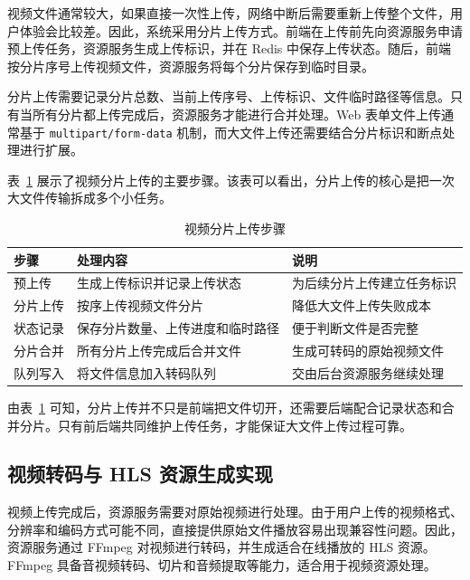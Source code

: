 视频文件通常较大，如果直接一次性上传，网络中断后需要重新上传整个文件，用户体验会比较差。因此，系统采用分片上传方式。前端在上传前先向资源服务申请预上传任务，资源服务生成上传标识，并在 Redis 中保存上传状态。随后，前端按分片序号上传视频文件，资源服务将每个分片保存到临时目录。

分片上传需要记录分片总数、当前上传序号、上传标识、文件临时路径等信息。只有当所有分片都上传完成后，资源服务才能进行合并处理。Web 表单文件上传通常基于 \texttt{multipart/form-data} 机制，而大文件上传还需要结合分片标识和断点处理进行扩展\cite{rfc7578multipart}。

表~\ref{tab:chunk-upload-steps} 展示了视频分片上传的主要步骤。该表可以看出，分片上传的核心是把一次大文件传输拆成多个小任务。

\begin{table}[htbp]
  \centering
  \caption{视频分片上传步骤}
  \label{tab:chunk-upload-steps}
  \begin{tabular}{p{}p{}p{}}
    \hline
    \textbf{步骤} & \textbf{处理内容} & \textbf{说明} \\
    \hline
    预上传 & 生成上传标识并记录上传状态 & 为后续分片上传建立任务标识 \\
    分片上传 & 按序上传视频文件分片 & 降低大文件上传失败成本 \\
    状态记录 & 保存分片数量、上传进度和临时路径 & 便于判断文件是否完整 \\
    分片合并 & 所有分片上传完成后合并文件 & 生成可转码的原始视频文件 \\
    队列写入 & 将文件信息加入转码队列 & 交由后台资源服务继续处理 \\
    \hline
  \end{tabular}
\end{table}

由表~\ref{tab:chunk-upload-steps} 可知，分片上传并不只是前端把文件切开，还需要后端配合记录状态和合并分片。只有前后端共同维护上传任务，才能保证大文件上传过程可靠。

\subsection{视频转码与 HLS 资源生成实现}
\label{subsec:transcode-hls-implementation}

视频上传完成后，资源服务需要对原始视频进行处理。由于用户上传的视频格式、分辨率和编码方式可能不同，直接提供原始文件播放容易出现兼容性问题。因此，资源服务通过 FFmpeg 对视频进行转码，并生成适合在线播放的 HLS 资源。FFmpeg 具备音视频转码、切片和音频提取等能力，适合用于视频资源处理\cite{ffmpegdocs}。

